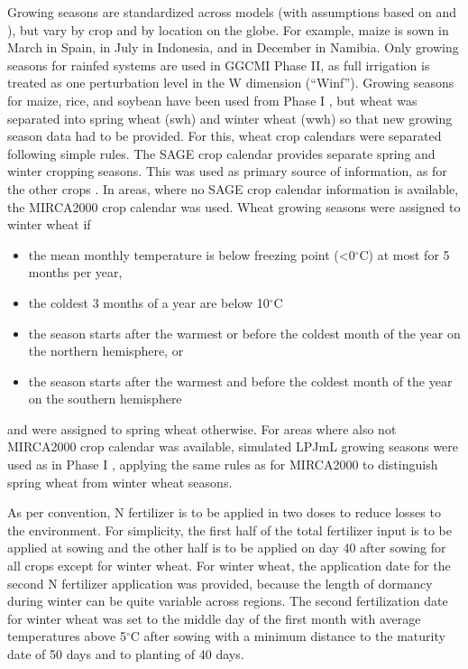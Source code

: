 \documentclass[gmd, manuscript]{copernicus} %
\begin{document}
Growing seasons are standardized across models (with assumptions based on \citet{Sacks2010} and \citet{Portmann2008, Portmann2010}), but vary by crop and by location on the globe. 
For example, maize is sown in March in Spain, in July in Indonesia, and in December in Namibia. 
Only growing seasons for rainfed systems are used in GGCMI Phase II, as full irrigation is treated as one perturbation level in the W dimension (``Winf'').
Growing seasons for maize, rice, and soybean have been used from Phase I \citep{Elliott2015}, but wheat was separated into spring wheat (swh) and winter wheat (wwh) so that new growing season data had to be provided. 
For this, wheat crop calendars were separated following simple rules. 
The SAGE crop calendar \citep{Sacks2010} provides separate spring and winter cropping seasons. 
This was used as primary source of information, as for the other crops \citep{Elliott2015}. 
In areas, where no SAGE crop calendar information is available, the MIRCA2000 crop calendar \citep{Portmann2010} was used. Wheat growing seasons were assigned to winter wheat if 
\begin{itemize}
\item the mean monthly temperature is below freezing point (<0$^\circ$C) at most for 5 months per year,
\item the coldest 3 months of a year are below 10$^\circ$C
\item the season starts after the warmest or before the coldest month of the year on the northern hemisphere, or
\item the season starts after the warmest and before the coldest month of the year on the southern hemisphere
\end{itemize}
and were assigned to spring wheat otherwise. 
For areas where also not MIRCA2000 crop calendar was available, simulated LPJmL growing seasons \citep{waha2012climate} were used as in Phase I \citep{Elliott2015}, applying the same rules as for MIRCA2000 to distinguish spring wheat from winter wheat seasons.

As per convention, N fertilizer is to be applied in two doses to reduce losses to the environment. For simplicity, the first half of the total fertilizer input is to be applied at sowing and the other half is to be applied on day 40 after sowing for all crops except for winter wheat. For winter wheat, the application date for the second N fertilizer application was provided, because the length of dormancy during winter can be quite variable across regions. The second fertilization date for winter wheat was set to the middle day of the first month with average temperatures above 5$^\circ$C after sowing with a minimum distance to the maturity date of 50 days and to planting of 40 days.
\end{document}
